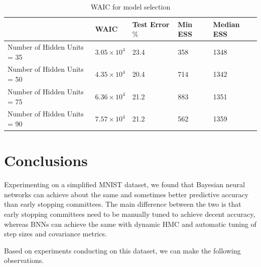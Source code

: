 \documentclass[12pt]{report}
\begin{document}
\begin{table}[]
\centering
\begin{tabular}{@{}lllll@{}}
\toprule
               & WAIC & Test Error$\%$ & Min ESS & Median ESS      \\ \midrule
Number of Hidden Units = 35    & $3.05 \times 10^4$  & 23.4    & 358 & 1348   \\ \midrule
Number of Hidden Units = 50  & $4.35 \times 10^4$   & 20.4  & 714  & 1342                \\ \midrule
Number of Hidden Units = 75 &$ 6.36 \times 10^4$   & 21.2  & 883  & 1351                 \\ \midrule
Number of Hidden Units = 90 &$ 7.57 \times 10^4$  & 21.2   & 562  & 1359                 \\ \bottomrule
\end{tabular}
\caption{WAIC for model selection}
\label{my-label}
\end{table}


\section{Conclusions}

Experimenting on a simplified MNIST dataset, we found that Bayesian neural networks can achieve about the same and sometimes better predictive accuracy than early stopping committees. The main difference between the two is that early stopping committees need to be manually  tuned to achieve decent accuracy, whereas BNNs can achieve the same with dynamic HMC and automatic tuning of step sizes and covariance metrics. 

Based on experiments conducting on this dataset, we can make the following observations.
\end{document}
